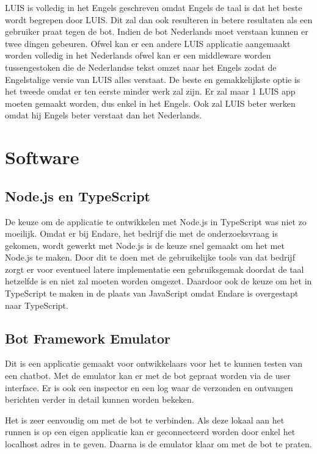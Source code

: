 LUIS is volledig in het Engels geschreven omdat Engels de taal is dat het beste wordt begrepen door LUIS. Dit zal dan ook resulteren in betere resultaten als een gebruiker praat tegen de bot. Indien de bot Nederlands moet verstaan kunnen er twee dingen gebeuren. Ofwel  kan er een andere LUIS applicatie aangemaakt worden volledig in het Nederlands ofwel kan er een middleware worden tussengestoken die de Nederlandse tekst omzet naar het Engels zodat de Engelstalige versie van LUIS alles verstaat. De beste en gemakkelijkste optie is het tweede omdat er ten eerste minder werk zal zijn. Er zal maar 1 LUIS app moeten gemaakt worden, dus enkel in het Engels. Ook zal LUIS beter werken omdat hij Engels beter verstaat dan het Nederlands.

\section{Software}
\label{sec:POC}

\subsection{Node.js en TypeScript}
\label{ts}

De keuze om de applicatie te ontwikkelen met Node.js in TypeScript was niet zo moeilijk. Omdat er bij Endare, het bedrijf die met de onderzoeksvraag is gekomen, wordt gewerkt met Node.js is de keuze snel gemaakt om het met Node.js te maken. Door dit te doen met de gebruikelijke tools van dat bedrijf zorgt er voor eventueel latere implementatie een gebruiksgemak doordat de taal hetzelfde is en niet zal moeten worden omgezet. Daardoor ook de keuze om het in TypeScript te maken in de plaats van JavaScript omdat Endare is overgestapt naar TypeScript.

\subsection{Bot Framework Emulator}
\label{emulator}

Dit is een applicatie gemaakt voor ontwikkelaars voor het te kunnen testen van een chatbot. Met de emulator kan er met de bot gepraat worden via de user interface. Er is ook een inspector en een log waar de verzonden en ontvangen berichten verder in detail kunnen worden bekeken.

Het is zeer eenvoudig om met de bot te verbinden. Als deze lokaal aan het runnen is op een eigen applicatie kan er geconnecteerd worden door enkel het localhost adres in te geven. Daarna is de emulator klaar om met de bot te praten.

